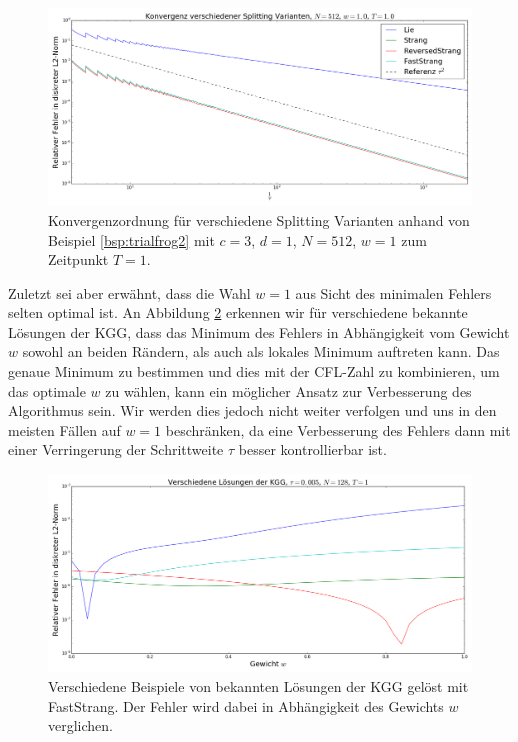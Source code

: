 \begin{mathbsp}
\begin{figure}[!htb]
\includegraphics[width=\textwidth]{Figures/splitting_convergence_fix_weight_frog2_cfl_corrected.png}
\caption{Konvergenzordnung für verschiedene Splitting Varianten anhand von Beispiel \ref{bsp:trialfrog2} mit $c=3$, $d=1$, $N=512$, $w=1$ zum Zeitpunkt $T=1$.}
\label{fig:splitting_convergence_w1}
\end{figure}
Zuletzt sei aber erwähnt, dass die Wahl $w=1$ aus Sicht des minimalen Fehlers selten optimal ist. An Abbildung \ref{fig:splitting_dependence_on_weight} erkennen wir für verschiedene bekannte Lösungen der KGG, dass das Minimum des Fehlers in Abhängigkeit vom Gewicht $w$ sowohl an beiden Rändern, als auch als lokales Minimum auftreten kann. Das genaue Minimum zu bestimmen und dies mit der CFL-Zahl zu kombinieren, um das optimale $w$ zu wählen, kann ein möglicher Ansatz zur Verbesserung des Algorithmus sein. Wir werden dies jedoch nicht weiter verfolgen und uns in den meisten Fällen auf $w=1$ beschränken, da eine Verbesserung des Fehlers dann mit einer Verringerung der Schrittweite $\tau$ besser kontrollierbar ist.
\begin{figure}[!htb]
\includegraphics[width=\textwidth]{Figures/splitting_error_over_weights.png}
\caption{Verschiedene Beispiele von bekannten Lösungen der KGG gelöst mit FastStrang. Der Fehler wird dabei in Abhängigkeit des Gewichts $w$ verglichen.}
\label{fig:splitting_dependence_on_weight}
\end{figure}
\end{mathbsp}

